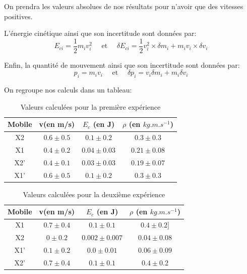 \documentclass[12pt]{article}
\begin{document}
On prendra les valeurs absolues de nos résultats pour n'avoir que des vitesses positives.	
		

L'énergie cinétique ainsi que son incertitude sont données par:
\begin{equation}
    E_{ci} = \frac{1}{2}m_iv_i^2 \quad \text{ et } \quad \delta E_{ci} = \frac{1}{2}v_i^2 \times \delta m_i + m_iv_i \times \delta v_i
\end{equation}

Enfin, la quantité de mouvement ainsi que son incertitude sont données par:
\begin{equation}
    p_i = m_iv_i \quad \text{ et } \quad \delta p_i = v_i\delta m_i + m_i\delta v_i
\end{equation}


On regroupe nos calculs dans un tableau:
\begin{table}[!h]
	\begin{center}
		\begin{tabular}{|c|c|c|c|}
		\hline
		Mobile & v(en m/s)  & $E_c$ (en J) & $\rho$ (en $kg.m.s^{-1}$) \\
		\hline
		X2 & $0.6\pm 0.5$ & $0.1\pm 0.2$ & $0.3 \pm 0.3$ \\
		\hline
		X1 & $0.4\pm 0.2$ & $0.04\pm 0.03$ & $0.21\pm 0.08$ \\
		\hline 
		X2' & $0.4\pm 0.1$ & $0.03\pm 0.03$ & $0.19\pm 0.07$\\
		\hline 
		X1' & $0.6\pm 0.5$ & $0.1\pm 0.2$ & $0.3\pm 0.3$\\
		\hline		
		\end{tabular}	
		\label{Tableau première expérience}
		\caption{Valeurs calculées pour la première expérience}
	\end{center}
\end{table}

\begin{table}[!h]
	\begin{center}
		\begin{tabular}{|c|c|c|c|}
		\hline
		Mobile & v(en m/s)  & $E_c$ (en J) & $\rho$ (en $kg.m.s^{-1}$) \\
		\hline
		X1 & $0.7\pm 0.4$ & $0.1 \pm 0.1$ & $0.4 \pm 0.2]$  \\
		\hline
		X2 & $0\pm 0.2$ & $0.002\pm 0.007$  & $0.04\pm 0.08$ \\
		\hline 
		X1' & $0.1\pm 0.2$ & $0.0\pm 0.01$  & $0.06\pm 0.09$ \\
		\hline 
		X2' & $0.7\pm 0.4$ & $0.1\pm 0.1$  & $0.4\pm 0.2$ \\
		\hline		
		\end{tabular}	
		\label{Tableau deuxième expérience}
		\caption{Valeurs calculées pour la deuxième expérience}
	\end{center}
\end{table}
\end{document}
